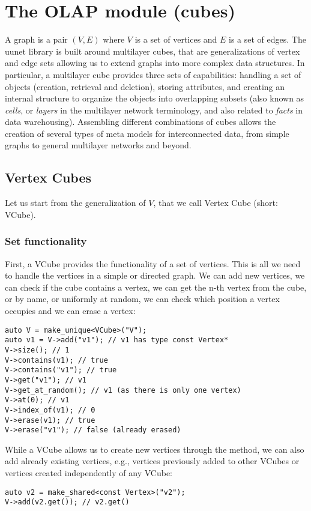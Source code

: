 \chapter{The OLAP module (cubes)} \label{ch:olap}

A graph is a pair $(V,E)$ where $V$ is a set of vertices and $E$ is a set of edges. The uunet library is built around multilayer cubes, that are generalizations of vertex and edge sets allowing us to extend graphs into more complex data structures. In particular, a multilayer cube provides three sets of capabilities: handling a set of objects (creation, retrieval and deletion), storing attributes, and creating an internal structure to organize the objects into overlapping subsets (also known as \emph{cells}, or \emph{layers} in the multilayer network terminology, and also related to \emph{facts} in data warehousing). Assembling different combinations of cubes allows the creation of several types of meta models for interconnected data, from simple graphs to general multilayer networks and beyond.


\section{Vertex Cubes}

Let us start from the generalization of $V$, that we call Vertex Cube (short: VCube).

\subsection{Set functionality}

First, a VCube provides the functionality of a set of vertices. This is all we need to handle the vertices in a simple or directed graph. We can add new vertices, we can check if the cube contains a vertex, we can get the n-th vertex from the cube, or by name, or uniformly at random, we can check which position a vertex occupies and we can erase a vertex:

\begin{lstlisting}[style=c++]
auto V = make_unique<VCube>("V");
auto v1 = V->add("v1"); // v1 has type const Vertex*
V->size(); // 1
V->contains(v1); // true
V->contains("v1"); // true
V->get("v1"); // v1
V->get_at_random(); // v1 (as there is only one vertex)
V->at(0); // v1
V->index_of(v1); // 0
V->erase(v1); // true
V->erase("v1"); // false (already erased)
\end{lstlisting}

While a VCube allows us to create new vertices through the  method, we can also add already existing vertices, e.g., vertices previously added to other VCubes or vertices created independently of any VCube:
\begin{lstlisting}[style=c++]
auto v2 = make_shared<const Vertex>("v2");
V->add(v2.get()); // v2.get()
\end{lstlisting}

